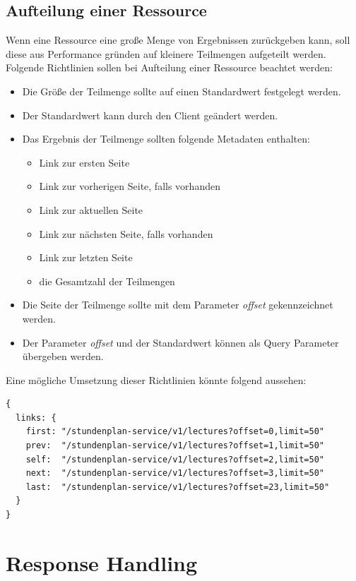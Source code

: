 \subsection{Aufteilung einer Ressource}

Wenn eine Ressource eine große Menge von Ergebnissen zurückgeben kann, soll diese aus Performance gründen auf kleinere Teilmengen aufgeteilt werden. Folgende Richtlinien sollen bei Aufteilung einer Ressource beachtet werden:

\begin{itemize}
\item Die Größe der Teilmenge sollte auf einen Standardwert festgelegt werden.
\item Der Standardwert kann durch den Client geändert werden.
\item Das Ergebnis der Teilmenge sollten folgende Metadaten enthalten:
	\begin{itemize}
	\item Link zur ersten Seite
	\item Link zur vorherigen Seite, falls vorhanden
	\item Link zur aktuellen Seite
	\item Link zur nächsten Seite, falls vorhanden
	\item Link zur letzten Seite
	\item die Gesamtzahl der Teilmengen
	\end{itemize}
\item Die Seite der Teilmenge sollte mit dem Parameter \textit{offset} gekennzeichnet werden.
\item Der Parameter \textit{offset} und der Standardwert können als Query Parameter übergeben werden.
\end{itemize}

Eine mögliche Umsetzung dieser Richtlinien könnte folgend aussehen:
\newpage
\begin{lstlisting}[label=lst:teilmenge,caption={Aufteilung der Ressource Vorlesung}]
{ 
  links: {
    first: "/stundenplan-service/v1/lectures?offset=0,limit=50"
    prev:  "/stundenplan-service/v1/lectures?offset=1,limit=50"
    self:  "/stundenplan-service/v1/lectures?offset=2,limit=50"
    next:  "/stundenplan-service/v1/lectures?offset=3,limit=50"
    last:  "/stundenplan-service/v1/lectures?offset=23,limit=50"
  }
}
\end{lstlisting}

\section{Response Handling}

